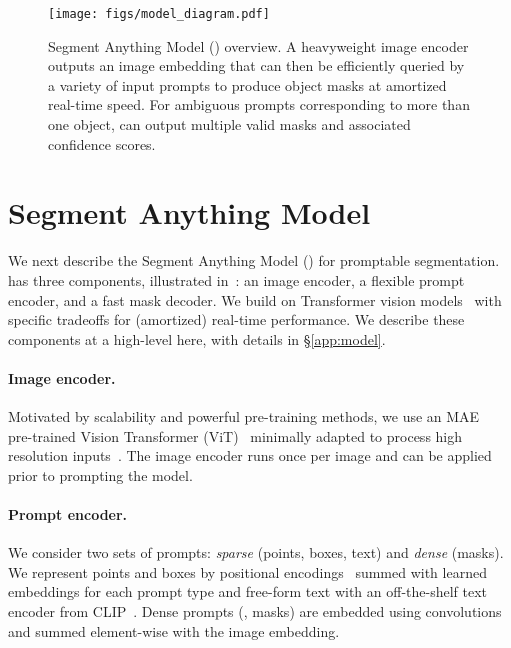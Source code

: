 \begin{figure*}[t]\centering
\texttt{[image: figs/model\_diagram.pdf]}\vspace{-1mm}
\caption{Segment Anything Model (\sam) overview. A heavyweight image encoder outputs an image embedding that can then be efficiently queried by a variety of input prompts to produce object masks at amortized real-time speed. For ambiguous prompts corresponding to more than one object, \sam can output multiple valid masks and associated confidence scores.}
\label{fig:model_diagram}
\vspace{-1mm}
\end{figure*}

\section{Segment Anything Model}\label{sec:model}

We next describe the Segment Anything Model (\sam) for promptable segmentation. \sam has three components, illustrated in~: an image encoder, a flexible prompt encoder, and a fast mask decoder. We build on Transformer vision models~\cite{Carion2020,Dosovitskiy2021,cheng2021per,li2022exploring} with specific tradeoffs for (amortized) real-time performance. We describe these components at a high-level here, with details in \S\ref{app:model}.

\paragraph{Image encoder.} Motivated by scalability and powerful pre-training methods, we use an MAE~\cite{he2022masked} pre-trained Vision Transformer (ViT)~\cite{Dosovitskiy2021} minimally adapted to process high resolution inputs~\cite{li2022exploring}. The image encoder runs once per image and can be applied prior to prompting the model.

\paragraph{Prompt encoder.} We consider two sets of prompts: \emph{sparse} (points, boxes, text) and \emph{dense} (masks). We represent points and boxes by positional encodings~\cite{tancik2020fourier} summed with learned embeddings for each prompt type and free-form text with an off-the-shelf text encoder from CLIP~\cite{Radford2021}. Dense prompts (\ie, masks) are embedded using convolutions and summed element-wise with the image embedding.

